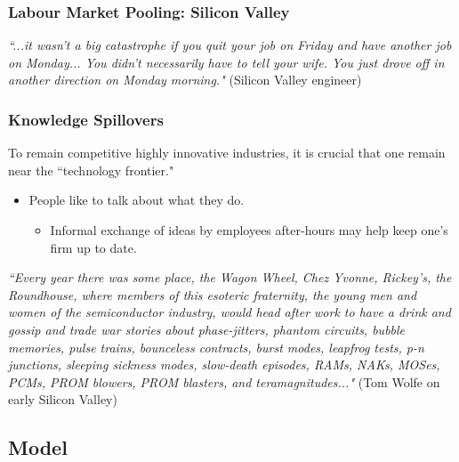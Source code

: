 \documentclass{beamer}
\begin{document}
\begin{frame}
	\frametitle{Labour Market Pooling: Silicon Valley}

		\emph{``...it wasn't a big catastrophe if you quit your job on Friday and have another job on Monday... You didn't necessarily have to tell your wife. You just drove off in another direction on Monday morning."} (Silicon Valley engineer)
	
\end{frame}

\begin{frame}
	\frametitle{Knowledge Spillovers}
To remain competitive highly innovative industries, it is crucial that one remain near the ``technology frontier."
	\begin{itemize}
		\item People like to talk about what they do.
			\begin{itemize}
				\item Informal exchange of ideas by employees after-hours may help keep one's firm up to date.
			\end{itemize} 
	\end{itemize}
	

		\emph{``Every year there was some place, the Wagon Wheel, Chez Yvonne, Rickey's, the Roundhouse, where members of this esoteric fraternity, the young men and women of the semiconductor industry, would head after work to have a drink and gossip and trade war stories about phase-jitters, phantom circuits, bubble memories, pulse trains, bounceless contracts, burst modes, leapfrog tests, p-n junctions, sleeping sickness modes, slow-death episodes, RAMs, NAKs, MOSes, PCMs, PROM blowers, PROM blasters, and teramagnitudes..."} (Tom Wolfe on early Silicon Valley)

	
\end{frame}

\subsection{Model}
\end{document}
